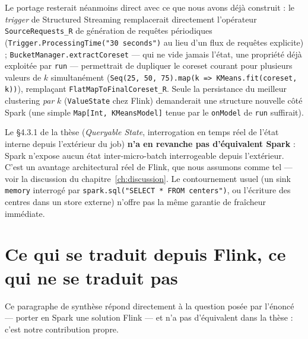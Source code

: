 Le portage resterait néanmoins direct avec ce que nous avons déjà construit :
le \emph{trigger} de Structured Streaming remplacerait directement
l'opérateur \texttt{SourceRequests\_R} de génération de requêtes périodiques
(\texttt{Trigger.ProcessingTime("30 seconds")} au lieu d'un flux de requêtes
explicite) ; \texttt{BucketManager.extractCoreset} --- qui ne vide jamais
l'état, une propriété déjà exploitée par \texttt{run} --- permettrait de
dupliquer le coreset courant pour plusieurs valeurs de $k$ simultanément
(\texttt{Seq(25, 50, 75).map(k => KMeans.fit(coreset, k))}), remplaçant
\texttt{FlatMapToFinalCoreset\_R}. Seule la persistance du meilleur
clustering \emph{par} $k$ (\texttt{ValueState} chez Flink) demanderait une
structure nouvelle côté Spark (une simple \texttt{Map[Int, KMeansModel]}
tenue par le \texttt{onModel} de \texttt{run} suffirait).

Le §4.3.1 de la thèse (\emph{Queryable State}, interrogation en temps réel de
l'état interne depuis l'extérieur du job) \textbf{n'a en revanche pas
d'équivalent Spark} : Spark n'expose aucun état inter-micro-batch
interrogeable depuis l'extérieur. C'est un avantage architectural réel de
Flink, que nous assumons comme tel --- voir la discussion du
chapitre~\ref{ch:discussion}. Le contournement usuel (un sink \texttt{memory}
interrogé par \texttt{spark.sql("SELECT * FROM centers")}, ou l'écriture des
centres dans un store externe) n'offre pas la même garantie de fraîcheur
immédiate.

\section{Ce qui se traduit depuis Flink, ce qui ne se traduit pas}
\label{sec:portage-flink-spark}

Ce paragraphe de synthèse répond directement à la question posée par
l'énoncé --- porter en Spark une solution Flink --- et n'a pas
d'équivalent dans la thèse : c'est notre contribution propre.

